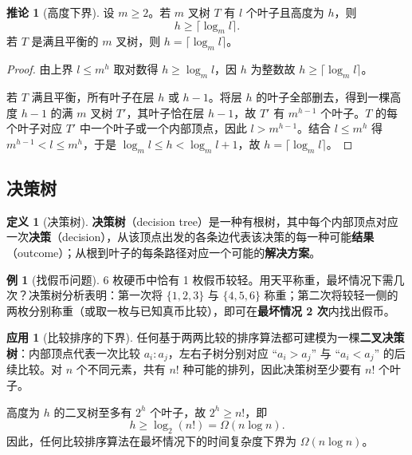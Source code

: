 \documentclass[UTF8,11pt,a4paper]{ctexbook}   %
\theoremstyle{definition}
\newtheorem{definition}{定义}[section]
\newtheorem{example}{例}[section]
\newtheorem{application}{应用}[section]
\newtheorem{corollary}{推论}[section]
\begin{document}
\begin{corollary}[高度下界]
设 $m\ge 2$。若 $m$ 叉树 $T$ 有 $l$ 个叶子且高度为 $h$，则
\[
h\ge \lceil\log_m l\rceil.
\]
若 $T$ 是满且平衡的 $m$ 叉树，则 $h=\lceil\log_m l\rceil$。
\end{corollary}

\begin{proof}
由上界 $l\le m^h$ 取对数得 $h\ge\log_m l$，因 $h$ 为整数故 $h\ge\lceil\log_m l\rceil$。

若 $T$ 满且平衡，所有叶子在层 $h$ 或 $h-1$。将层 $h$ 的叶子全部删去，得到一棵高度 $h-1$ 的满 $m$ 叉树 $T'$，其叶子恰在层 $h-1$，故 $T'$ 有 $m^{h-1}$ 个叶子。$T$ 的每个叶子对应 $T'$ 中一个叶子或一个内部顶点，因此 $l>m^{h-1}$。结合 $l\le m^h$ 得 $m^{h-1}<l\le m^h$，于是 $\log_m l\le h<\log_m l+1$，故 $h=\lceil\log_m l\rceil$。
\end{proof}

\subsection{决策树}

\begin{definition}[决策树]
\textbf{决策树}（decision tree）是一种有根树，其中每个内部顶点对应一次\textbf{决策}（decision），从该顶点出发的各条边代表该决策的每一种可能\textbf{结果}（outcome）；从根到叶子的每条路径对应一个可能的\textbf{解决方案}。
\end{definition}

\begin{example}[找假币问题]
6 枚硬币中恰有 1 枚假币较轻。用天平称重，最坏情况下需几次？决策树分析表明：第一次将 $\{1,2,3\}$ 与 $\{4,5,6\}$ 称重；第二次将较轻一侧的两枚分别称重（或取一枚与已知真币比较），即可在\textbf{最坏情况 2 次}内找出假币。
\end{example}

\begin{application}[比较排序的下界]
任何基于两两比较的排序算法都可建模为一棵\textbf{二叉决策树}：内部顶点代表一次比较 $a_i:a_j$，左右子树分别对应 ``$a_i>a_j$'' 与 ``$a_i<a_j$'' 的后续比较。对 $n$ 个不同元素，共有 $n!$ 种可能的排列，因此决策树至少要有 $n!$ 个叶子。

高度为 $h$ 的二叉树至多有 $2^h$ 个叶子，故 $2^h\ge n!$，即
\[
h\ge \log_2(n!) = \Omega(n\log n).
\]
因此，任何比较排序算法在最坏情况下的时间复杂度下界为 $\Omega(n\log n)$。
\end{application}

\end{document}
